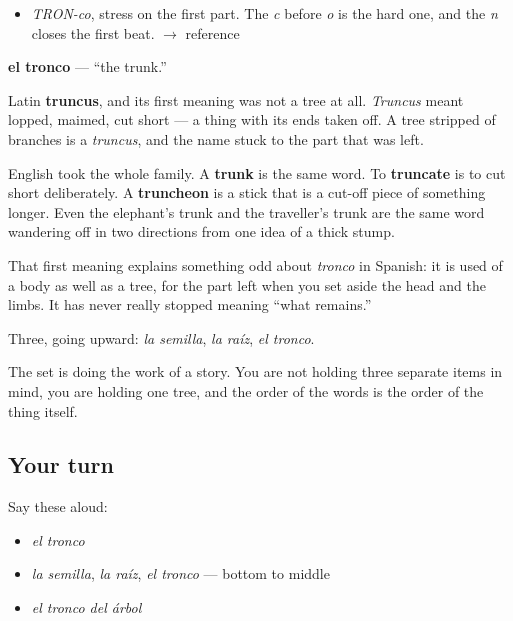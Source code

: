 \begin{sounds}
\begin{itemize}
\raggedright
  \item \emph{TRON-co}, stress on the first part. The \emph{c} before \emph{o} is the hard one, and the \emph{n} closes the first beat. $\to$ reference
\end{itemize}
\end{sounds}

\begin{cousinweb}
\textbf{el tronco} — \textquotedblleft{}the trunk.\textquotedblright{}

Latin \textbf{truncus}, and its first meaning was not a tree at all. \emph{Truncus} meant lopped, maimed, cut short — a thing with its ends taken off. A tree stripped of branches is a \emph{truncus}, and the name stuck to the part that was left.

English took the whole family. A \textbf{trunk} is the same word. To \textbf{truncate} is to cut short deliberately. A \textbf{truncheon} is a stick that is a cut-off piece of something longer. Even the elephant's trunk and the traveller's trunk are the same word wandering off in two directions from one idea of a thick stump.

That first meaning explains something odd about \emph{tronco} in Spanish: it is used of a body as well as a tree, for the part left when you set aside the head and the limbs. It has never really stopped meaning \textquotedblleft{}what remains.\textquotedblright{}
\end{cousinweb}

\begin{grammarlens}[title={What you've built}]
Three, going upward: \emph{la semilla}, \emph{la raíz}, \emph{el tronco}.

The set is doing the work of a story. You are not holding three separate items in mind, you are holding one tree, and the order of the words is the order of the thing itself.
\end{grammarlens}

\subsection*{Your turn}
Say these aloud:

\begin{itemize}
\raggedright
  \item \emph{el tronco}
  \item \emph{la semilla}, \emph{la raíz}, \emph{el tronco} — bottom to middle
  \item \emph{el tronco del árbol}
\end{itemize}

